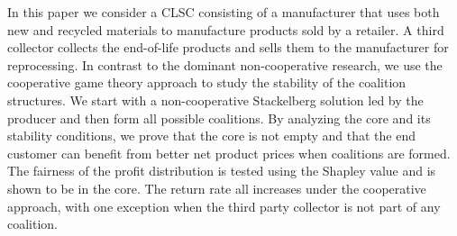 
\begin{Abstrakt}
    In this paper we consider a CLSC consisting of a manufacturer that uses both new and recycled materials to manufacture products sold by a retailer. A third collector collects the end-of-life products and sells them to the manufacturer for reprocessing. In contrast to the dominant non-cooperative research, we use the cooperative game theory approach to study the stability of the coalition structures. We start with a non-cooperative Stackelberg solution led by the producer and then form all possible coalitions. By analyzing the core and its stability conditions, we prove that the core is not empty and that the end customer can benefit from better net product prices when coalitions are formed. The fairness of the profit distribution is tested using the Shapley value and is shown to be in the core. The return rate all increases under the cooperative approach, with one exception when the third party collector is not part of any coalition.
\end{Abstrakt}



\clearpage